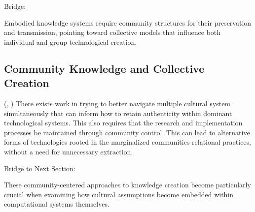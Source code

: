 Bridge:

Embodied knowledge systems require community structures for their preservation and transmission, pointing toward collective models that influence both  individual and group technological creation.

\subsection{Community Knowledge and Collective Creation}(\parencite{Smith_2012}, \parencite{Escobar_2018})
There exists work in trying to better navigate multiple cultural system simultaneously that can inform how to retain authenticity within dominant technological systems. This also requires that the research and implementation processes be maintained through community control. This can lead to alternative forms of technologies rooted in the marginalized communities relational practices, without a need for unnecessary extraction.

Bridge to Next Section:

These community-centered approaches to knowledge creation become particularly crucial when examining how cultural assumptions become embedded within computational systems themselves.
